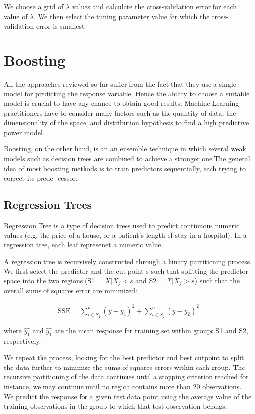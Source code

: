We choose a grid of $\lambda$ values and calculate the cross-validation error
for each value of $\lambda$. We then select the tuning parameter value for which
the cross-validation error is smallest.


\section{Boosting}

All the approaches reviewed so far suffer from the fact that they use a single
model for predicting the response variable. Hence the ability to choose a
suitable model is crucial to have any chance to obtain good results.
Machine Learning practitioners have to consider many factors such as
the quantity of data, the dimensionality of the space, and distribution
hypothesis to find a high predictive power model.

Boosting, on the other hand, is an an ensemble technique in which several weak
models such as decision trees  are combined to achieve a stronger one.The
general idea of most boosting methods is to train predictors sequentially, each
trying to correct its prede‐ cessor.

\subsection{Regression Trees}

Regression Tree is a type of decision trees  used to predict continuous
numeric values (e.g. the price of a house, or a patient's length of stay in a
hospital). In a regression tree, each leaf represenet a numeric value.

A regression tree is recursively constructed through a binary partitioning
process. We first select the predictor  and the cut point s such that splitting
the predictor space into the two regions (S1 = {${X|X_j <s}$} and S2 = {${X|X_j
> s}$}) such that the overall sums of squares error are minimized:

\begin{eqnarray}
  \textrm{SSE} = \sum_{i\in S_1}^{n}(y-\bar{y_1})^2 + \sum_{i \in S_2}^{n}(y-\bar{y_2})^2
\end{eqnarray}


where $\hat{y_1}$ and  $\hat{y_1}$ are the mean response for  training set within groups
S1 and S2, respectively.

We repeat the process, looking for the best predictor and best cutpoint to split
the data further to minimize the sums of squares errors within each group. The
recursive partitioning of the data continues until a stopping criterion reached
for instance, we may continue until no region contains more than 20
observations.
We predict the response for a given test data point using the average value of
the training observations in the group to which that test observation belongs.

